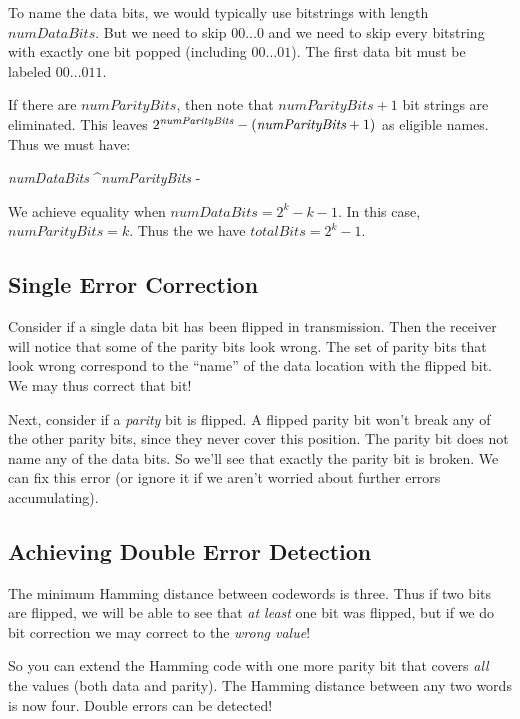 \documentclass[11pt, oneside]{amsart}
\begin{document}
To name the data bits, we would typically use bitstrings with length
$\textit{numDataBits}$. But we need to skip $00\ldots0$ and we need to
skip every bitstring with exactly one bit popped (including
$00\ldots01$). The first data bit must be labeled $00\ldots011$.

If there are $\textit{numParityBits}$, then note that $numParityBits +
1$ bit strings are eliminated. This leaves $2^{\textit{numParityBits}} -
\mathopen{}\left( {\textit{numParityBits} + 1} \right)\mathclose{}$ as eligible names. Thus we must
have:

\begin{nedqn}
  \textit{numDataBits}
^{\textit{numParityBits}} - 
\end{nedqn}

We achieve equality when $\textit{numDataBits} = 2^k - {k - 1}$. In this
case, $\textit{numParityBits} = k$. Thus the we have $\textit{totalBits}
= 2^k - 1$.

\subsection{Single Error Correction}

Consider if a single data bit has been flipped in transmission. Then the
receiver will notice that some of the parity bits look wrong. The set of
parity bits that look wrong correspond to the ``name'' of the data
location with the flipped bit. We may thus correct that bit!

Next, consider if a \emph{parity} bit is flipped. A flipped parity bit
won't break any of the other parity bits, since they never cover this
position. The parity bit does not name any of the data bits. So we'll
see that exactly the parity bit is broken. We can fix this error (or
ignore it if we aren't worried about further errors accumulating).

\subsection{Achieving Double Error Detection}

The minimum Hamming distance between codewords is three. Thus if two
bits are flipped, we will be able to see that \emph{at least} one bit
was flipped, but if we do bit correction we may correct to the
\emph{wrong value}!

So you can extend the Hamming code with one more parity bit that covers
\emph{all} the values (both data and parity). The Hamming distance
between any two words is now four. Double errors can be detected!
\end{document}
